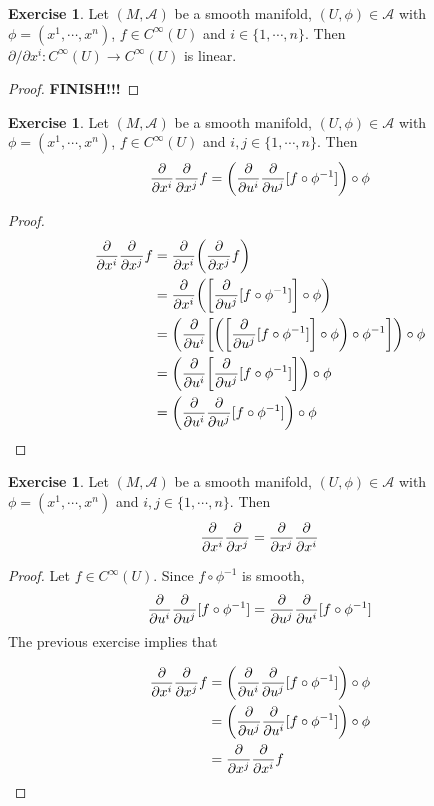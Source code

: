 \documentclass[12pt]{amsart}
\theoremstyle{definition}
\newtheorem{ex}[definition]{Exercise}
\newcommand{\MA}{\mathcal{A}}
\newcommand{\p}{\partial}
\begin{document}
	\begin{ex}
	Let $(M, \MA)$ be a smooth manifold, $(U, \phi) \in \MA$ with $\phi = (x^1, \cdots, x^n)$, $f \in C^{\infty}(U)$ and $i \in \{1, \cdots, n\}$. Then $\p / \p x^i:  C^{\infty}(U) \rightarrow C^{\infty}(U)$ is linear.
	\end{ex}
	
	\begin{proof}
	\textbf{FINISH!!!}
	\end{proof}
	
	\begin{ex}
	Let $(M, \MA)$ be a smooth manifold, $(U, \phi) \in \MA$ with $\phi = (x^1, \cdots, x^n)$, $f \in C^{\infty}(U)$ and $i,j \in \{1, \cdots, n\}$. Then 
	$$ \pdv{x^i} \pdv{x^j} f =  \bigg(\pdv{u^i} \pdv{u^j}[f \circ \phi^{-1}] \bigg) \circ \phi $$
	\end{ex}
	
	\begin{proof}
	
	\begin{align*}
	\pdv{x^i} \pdv{x^j} f 
	&= \pdv{x^i} \bigg( \pdv{x^j} f \bigg) \\
	&= \pdv{x^i} \bigg( \bigg[\pdv{u^j} [f \circ \phi^{-1}] \bigg] \circ \phi \bigg) \\
	&=  \bigg( \pdv{u^i} \bigg[ \bigg( \bigg[\pdv{u^j} [f \circ \phi^{-1}] \bigg] \circ \phi \bigg) \circ \phi^{-1} \bigg] \bigg) \circ \phi \\
	&= \bigg( \pdv{u^i} \bigg[\pdv{u^j} [f \circ \phi^{-1}] \bigg]  \bigg) \circ \phi \\
	&= \bigg( \pdv{u^i} \pdv{u^j} [f \circ \phi^{-1}]  \bigg) \circ \phi \\
	\end{align*}
	\end{proof}
	
	\begin{ex}
	Let $(M, \MA)$ be a smooth manifold, $(U, \phi) \in \MA$ with $\phi = (x^1, \cdots, x^n)$ and $i,j \in \{1, \cdots, n\}$. Then 
	\begin{equation*}
	\pdv{x^i}\pdv{x^j} = \pdv{x^j}\pdv{x^i}
	\end{equation*}
	\end{ex}
	
	\begin{proof}
	Let $f \in C^{\infty}(U)$. Since $f \circ \phi^{-1}$ is smooth, $$\pdv{u^i} \pdv{u^j} [f \circ \phi^{-1}] = \pdv{u^j} \pdv{u^i} [f \circ \phi^{-1}] $$
	The previous exercise implies that 
	
	\begin{align*}
	\pdv{x^i}\pdv{x^j}f 
	&= \bigg( \pdv{u^i} \pdv{u^j} [f \circ \phi^{-1}]  \bigg) \circ \phi \\
	&= \bigg( \pdv{u^j} \pdv{u^i} [f \circ \phi^{-1}]  \bigg) \circ \phi \\
	&= \pdv{x^j}\pdv{x^i}f 
	\end{align*}
	\end{proof}
	
\end{document}

